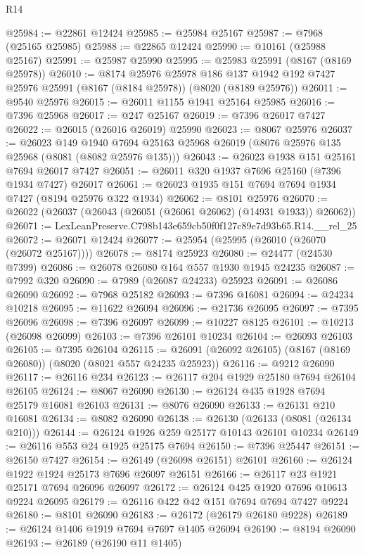 \begin{lexlean}{R14}
\begin{coremodule}
@25984 := @22861 @12424
@25985 := @25984 @25167
@25987 := @7968 (@25165 @25985)
@25988 := @22865 @12424
@25990 := @10161 (@25988 @25167)
@25991 := @25987 @25990
@25995 := @25983 @25991 (@8167 (@8169 @25978))
@26010 := @8174
    @25976
    @25978
    @186
    @137
    @1942
    @192
    @7427
    @25976
    @25991
    (@8167 (@8184 @25978))
    (@8020 (@8189 @25976))
@26011 := @9540 @25976
@26015 := @26011 @1155 @1941 @25164 @25985
@26016 := @7396 @25968
@26017 := @247 @25167
@26019 := @7396 @26017 @7427
@26022 := @26015 (@26016 @26019) @25990
@26023 := @8067 @25976
@26037 := @26023
    @149
    @1940
    @7694
    @25163
    @25968
    @26019
    (@8076 @25976 @135 @25968 (@8081 (@8082 @25976 @135)))
@26043 := @26023 @1938 @151 @25161 @7694 @26017 @7427
@26051 := @26011 @320 @1937 @7696 @25160 (@7396 @1934 @7427) @26017
@26061 := @26023 @1935 @151 @7694 @7694 @1934 @7427 (@8194 @25976 @322 @1934)
@26062 := @8101 @25976
@26070 := @26022 (@26037 (@26043 (@26051 (@26061 @26062) (@14931 @1933)) @26062))
@26071 := LexLeanPreserve.C798b143e659cb50f0f127c89e7d93b65.R14.__rel_25
@26072 := @26071 @12424
@26077 := @25954 (@25995 (@26010 (@26070 (@26072 @25167))))
@26078 := @8174 @25923
@26080 := @24477 (@24530 @7399)
@26086 := @26078 @26080 @164 @557 @1930 @1945 @24235
@26087 := @7992 @320
@26090 := @7989 (@26087 @24233) @25923
@26091 := @26086 @26090
@26092 := @7968 @25182
@26093 := @7396 @16081
@26094 := @24234 @10218
@26095 := @11622 @26094
@26096 := @21736 @26095
@26097 := @7395 @26096
@26098 := @7396 @26097
@26099 := @10227 @8125
@26101 := @10213 (@26098 @26099)
@26103 := @7396 @26101 @10234
@26104 := @26093 @26103
@26105 := @7395 @26104
@26115 := @26091 (@26092 @26105) (@8167 (@8169 @26080)) (@8020 (@8021 @557 @24235 @25923))
@26116 := @9212 @26090
@26117 := @26116 @234
@26123 := @26117 @204 @1929 @25180 @7694 @26104 @26105
@26124 := @8067 @26090
@26130 := @26124 @435 @1928 @7694 @25179 @16081 @26103
@26131 := @8076 @26090
@26133 := @26131 @210 @16081
@26134 := @8082 @26090
@26138 := @26130 (@26133 (@8081 (@26134 @210)))
@26144 := @26124 @1926 @259 @25177 @10143 @26101 @10234
@26149 := @26116 @553 @24 @1925 @25175 @7694
@26150 := @7396 @25447
@26151 := @26150 @7427
@26154 := @26149 (@26098 @26151) @26101
@26160 := @26124 @1922 @1924 @25173 @7696 @26097 @26151
@26166 := @26117 @23 @1921 @25171 @7694 @26096 @26097
@26172 := @26124 @425 @1920 @7696 @10613 @9224 @26095
@26179 := @26116 @422 @42 @151 @7694 @7694 @7427 @9224
@26180 := @8101 @26090
@26183 := @26172 (@26179 @26180 @9228)
@26189 := @26124 @1406 @1919 @7694 @7697 @1405 @26094
@26190 := @8194 @26090
@26193 := @26189 (@26190 @11 @1405)

\end{coremodule}
\end{lexlean}
